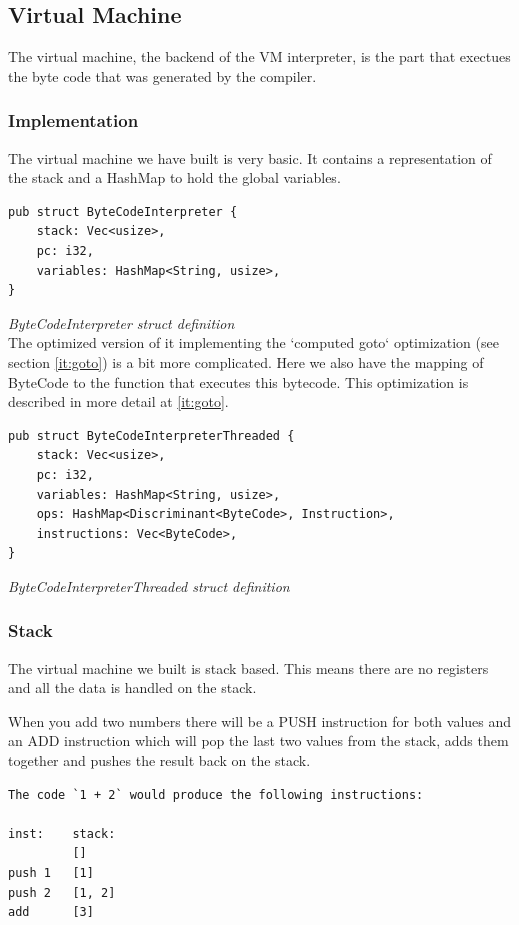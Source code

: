 \documentclass{article}
\begin{document}
\subsection{Virtual Machine}
The virtual machine, the backend of the VM interpreter, is the part that
exectues the byte code that was generated by the compiler.

\subsubsection{Implementation}
The virtual machine we have built is very basic. It contains a representation
of the stack and a HashMap to hold the global variables.

\begin{verbatim}
pub struct ByteCodeInterpreter {
    stack: Vec<usize>,
    pc: i32,
    variables: HashMap<String, usize>,
}
\end{verbatim}
\textit{ByteCodeInterpreter struct definition} \\

The optimized version of it implementing the `computed goto` optimization (see
section \ref{it:goto}) is a bit more complicated. Here we also have the mapping
of ByteCode to the function that executes this bytecode. This optimization is 
described in more detail at \ref{it:goto}.

\begin{verbatim}
pub struct ByteCodeInterpreterThreaded {
    stack: Vec<usize>,
    pc: i32,
    variables: HashMap<String, usize>,
    ops: HashMap<Discriminant<ByteCode>, Instruction>,
    instructions: Vec<ByteCode>,
}
\end{verbatim}
\textit{ByteCodeInterpreterThreaded struct definition} \\

\subsubsection{Stack}
The virtual machine we built is stack based. This means there are no registers
and all the data is handled on the stack.

When you add two numbers there will be a PUSH instruction for both values
and an ADD instruction which will pop the last two values from the stack,
adds them together and pushes the result back on the stack.

\begin{verbatim}
The code `1 + 2` would produce the following instructions:

inst:    stack:
         []
push 1   [1]
push 2   [1, 2]
add      [3]
\end{verbatim}
\end{document}
